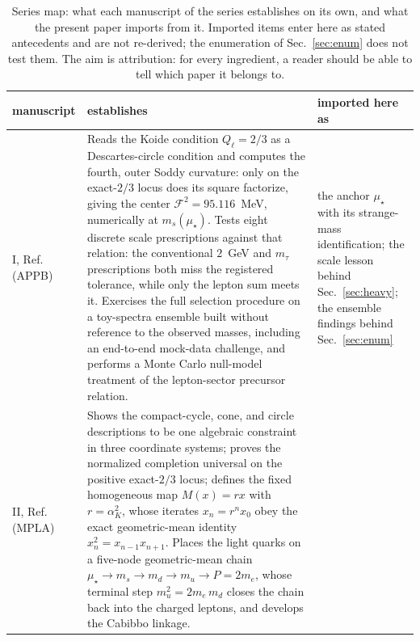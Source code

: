 \documentclass[aps,twocolumn,superscriptaddress,nofootinbib,floatfix]{revtex4-2}
\newcommand{\mstar}{\mu_\star}
\newcommand{\alphaK}{\alpha_K}
\begin{document}
\begin{table}[t]
\begin{ruledtabular}
\end{ruledtabular}
\end{table}

\begin{table}[t]
\caption{Series map: what each manuscript of the series establishes on its own, and what the present paper imports from it. Imported items enter here as stated antecedents and are not re-derived; the enumeration of Sec.~\ref{sec:enum} does not test them. The aim is attribution: for every ingredient, a reader should be able to tell which paper it belongs to.}
\label{tab:series}
\begin{ruledtabular}
\begin{tabular}{p{}p{}p{}}
manuscript & establishes & imported here as \\
\hline
I, Ref.~\cite{BrilliantAPPB} (APPB) &
Reads the Koide condition $Q_\ell=2/3$ as a Descartes-circle condition and computes the fourth, outer Soddy curvature: only on the exact-$2/3$ locus does its square factorize, giving the center $\mathcal F^2=95.116$~MeV, numerically at $m_s(\mstar)$. Tests eight discrete scale prescriptions against that relation: the conventional $2$~GeV and $m_\tau$ prescriptions both miss the registered tolerance, while only the lepton sum meets it. Exercises the full selection procedure on a toy-spectra ensemble built without reference to the observed masses, including an end-to-end mock-data challenge, and performs a Monte Carlo null-model treatment of the lepton-sector precursor relation. &
the anchor $\mstar$ with its strange-mass identification; the scale lesson behind Sec.~\ref{sec:heavy}; the ensemble findings behind Sec.~\ref{sec:enum} \\
II, Ref.~\cite{BrilliantMPLA} (MPLA) &
Shows the compact-cycle, cone, and circle descriptions to be one algebraic constraint in three coordinate systems; proves the normalized completion universal on the positive exact-$2/3$ locus; defines the fixed homogeneous map $M(x)=rx$ with $r=\alphaK^2$, whose iterates $x_n=r^nx_0$ obey the exact geometric-mean identity $x_n^2=x_{n-1}x_{n+1}$. Places the light quarks on a five-node geometric-mean chain $\mstar\to m_s\to m_d\to m_u\to P=2m_e$, whose terminal step $m_u^2=2m_e\,m_d$ closes the chain back into the charged leptons, and develops the Cabibbo linkage. &

\end{tabular}
\end{ruledtabular}
\end{table}
\end{document}
